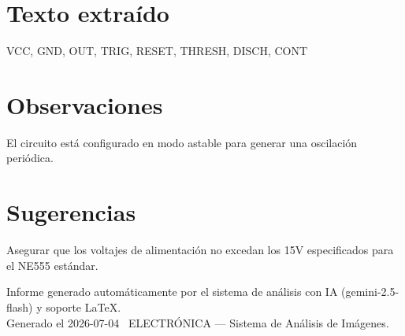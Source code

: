 \documentclass[11pt,a4paper]{article}
\begin{document}
\section*{Texto extraído}
VCC, GND, OUT, TRIG, RESET, THRESH, DISCH, CONT

\section*{Observaciones}
El circuito está configurado en modo astable para generar una oscilación periódica.

\section*{Sugerencias}
Asegurar que los voltajes de alimentación no excedan los 15V especificados para el NE555 estándar.

\vspace{12pt}
\begin{center}
  \footnotesize\color{gray}
  Informe generado automáticamente por el sistema de análisis con IA (gemini-2.5-flash) y soporte LaTeX. \\
  Generado el 2026-07-04 \textbullet\ ELECTRÓNICA --- Sistema de Análisis de Imágenes.
\end{center}
\end{document}

